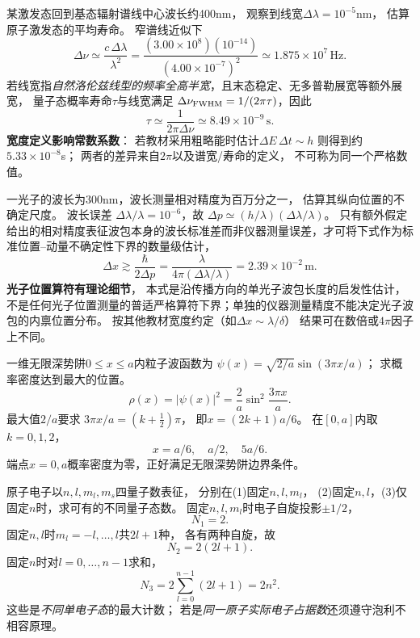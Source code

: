 \problemtext 某激发态回到基态辐射谱线中心波长约400nm，
观察到线宽$\Delta\lambda=10^{-5}$nm，
估算原子激发态的平均寿命。
\workings
窄谱线近似下
\[
\Delta\nu\simeq\frac{c\,\Delta\lambda}{\lambda^2}
=\frac{(3.00\times10^8)(10^{-14})}{(4.00\times10^{-7})^2}
\simeq1.875\times10^7\,\mathrm{Hz}.
\]
若线宽指\emph{自然洛伦兹线型的频率全高半宽}，且末态稳定、无多普勒展宽等额外展宽，
量子态概率寿命$\tau$与线宽满足
$\Delta\nu_{\rm FWHM}=1/(2\pi\tau)$，因此
\[
\boxed{\tau\simeq\frac1{2\pi\Delta\nu}
\simeq8.49\times10^{-9}\,\mathrm s}.
\]
\crosscheck \textbf{宽度定义影响常数系数}：
若教材采用粗略能时估计$\Delta E\,\Delta t\sim h$
则得到约$5.33\times10^{-8}$s；
两者的差异来自$2\pi$以及谱宽/寿命的定义，
不可称为同一个严格数值。

\problemtext 一光子的波长为300nm，波长测量相对精度为百万分之一，
估算其纵向位置的不确定尺度。
\workings
波长误差
$\Delta\lambda/\lambda=10^{-6}$，故
$\Delta p\simeq(h/\lambda)(\Delta\lambda/\lambda)$。
只有额外假定给出的相对精度表征波包本身的波长标准差而非仪器测量误差，才可将下式作为标准位置--动量不确定性下界的数量级估计，
\[
\Delta x\gtrsim\frac{\hbar}{2\Delta p}
=\frac{\lambda}{4\pi(\Delta\lambda/\lambda)}
=\boxed{2.39\times10^{-2}\,\mathrm m}.
\]
\crosscheck \textbf{光子位置算符有理论细节}，
本式是沿传播方向的单光子波包长度的启发性估计，
不是任何光子位置测量的普适严格算符下界；单独的仪器测量精度不能决定光子波包的内禀位置分布。
按其他教材宽度约定（如$\Delta x\sim\lambda/\delta$）
结果可在数倍或$4\pi$因子上不同。

\problemtext 一维无限深势阱$0\le x\le a$内粒子波函数为
$\psi(x)=\sqrt{2/a}\sin(3\pi x/a)$；
求概率密度达到最大的位置。
\workings
\[
\rho(x)=|\psi(x)|^2=\frac2a\sin^2\frac{3\pi x}{a}.
\]
最大值$2/a$要求
$3\pi x/a=(k+\tfrac12)\pi$，
即$x=(2k+1)a/6$。
在$[0,a]$内取$k=0,1,2$，
\[
\boxed{x=a/6,\quad a/2,\quad 5a/6}.
\]
\crosscheck 端点$x=0,a$概率密度为零，正好满足无限深势阱边界条件。

\problemtext 原子电子以$n,l,m_l,m_s$四量子数表征，
分别在(1)固定$n,l,m_l$，
(2)固定$n,l$，(3)仅固定$n$时，求可有的不同量子态数。
\workings
固定$n,l,m_l$时电子自旋投影$\pm1/2$，
\[
\boxed{N_1=2}.
\]
固定$n,l$时$m_l=-l,\ldots,l$共$2l+1$种，
各有两种自旋，故
\[
\boxed{N_2=2(2l+1)}.
\]
固定$n$时对$l=0,\ldots,n-1$求和，
\[
\boxed{N_3=2\sum_{l=0}^{n-1}(2l+1)=2n^2}.
\]
\crosscheck 这些是\emph{不同单电子态}的最大计数；
若是\emph{同一原子实际电子占据数}还须遵守泡利不相容原理。
